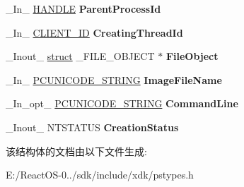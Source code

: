 \begin{DoxyCompactItemize}
\begin{tabbing}
\end{tabbing}\item 
\mbox{\label{struct___p_s___c_r_e_a_t_e___n_o_t_i_f_y___i_n_f_o_a443d8365bc05a5148e3f2436b0a189d7}} 
\+\_\+\+In\+\_\+ \hyperlink{interfacevoid}{H\+A\+N\+D\+LE} {\bfseries Parent\+Process\+Id}
\item 
\mbox{\label{struct___p_s___c_r_e_a_t_e___n_o_t_i_f_y___i_n_f_o_ae31f0982dd2a68cb1072c14304ca7a81}} 
\+\_\+\+In\+\_\+ \hyperlink{struct___c_l_i_e_n_t___i_d}{C\+L\+I\+E\+N\+T\+\_\+\+ID} {\bfseries Creating\+Thread\+Id}
\item 
\mbox{\label{struct___p_s___c_r_e_a_t_e___n_o_t_i_f_y___i_n_f_o_a0f4945c60bf1c0d0df1729a9844444a6}} 
\+\_\+\+Inout\+\_\+ \hyperlink{interfacestruct}{struct} \+\_\+\+F\+I\+L\+E\+\_\+\+O\+B\+J\+E\+CT $\ast$ {\bfseries File\+Object}
\item 
\mbox{\label{struct___p_s___c_r_e_a_t_e___n_o_t_i_f_y___i_n_f_o_a7c67c09f880336e48f841d0e07c5f310}} 
\+\_\+\+In\+\_\+ \hyperlink{struct___u_n_i_c_o_d_e___s_t_r_i_n_g}{P\+C\+U\+N\+I\+C\+O\+D\+E\+\_\+\+S\+T\+R\+I\+NG} {\bfseries Image\+File\+Name}
\item 
\mbox{\label{struct___p_s___c_r_e_a_t_e___n_o_t_i_f_y___i_n_f_o_a04d4f637836bb3898a5f506b3e397bcb}} 
\+\_\+\+In\+\_\+opt\+\_\+ \hyperlink{struct___u_n_i_c_o_d_e___s_t_r_i_n_g}{P\+C\+U\+N\+I\+C\+O\+D\+E\+\_\+\+S\+T\+R\+I\+NG} {\bfseries Command\+Line}
\item 
\mbox{\label{struct___p_s___c_r_e_a_t_e___n_o_t_i_f_y___i_n_f_o_a1d069f85ca6d70efb7ede4409348050d}} 
\+\_\+\+Inout\+\_\+ N\+T\+S\+T\+A\+T\+US {\bfseries Creation\+Status}
\end{DoxyCompactItemize}


该结构体的文档由以下文件生成\+:\begin{DoxyCompactItemize}
\item 
E\+:/\+React\+O\+S-\/0../sdk/include/xdk/pstypes.\+h\end{DoxyCompactItemize}
